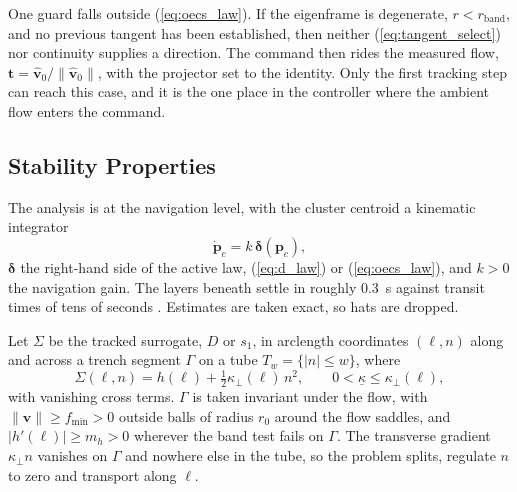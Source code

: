\documentclass[lettersize,journal]{IEEEtran}
\begin{document}
One guard falls outside (\ref{eq:oecs_law}). If the eigenframe is
degenerate, $r < r_{\mathrm{band}}$, and no previous tangent has been
established, then neither (\ref{eq:tangent_select}) nor continuity
supplies a direction. The command then rides the measured flow,
$\mathbf{t} = \hat{\mathbf{v}}_0/\|\hat{\mathbf{v}}_0\|$, with the
projector set to the identity. Only the first tracking step can reach
this case, and it is the one place in the controller where the ambient
flow enters the command.



\subsection{Stability Properties}
\label{sec:stability}

The analysis is at the navigation level, with the cluster centroid a
kinematic integrator
\begin{equation}
    \dot{\mathbf{p}}_c = k\,\boldsymbol{\delta}(\mathbf{p}_c),
    \label{eq:kinematic_model}
\end{equation}
$\boldsymbol{\delta}$ the right-hand side of the active law,
(\ref{eq:d_law}) or (\ref{eq:oecs_law}), and $k > 0$ the navigation
gain. The layers beneath settle in roughly 0.3~s against transit times
of tens of seconds \cite{9}. Estimates are taken exact, so hats are
dropped.

Let $\Sigma$ be the tracked surrogate, $D$ or $s_1$, in arclength
coordinates $(\ell, n)$ along and across a trench segment $\Gamma$ on a
tube $T_w = \{|n| \leq w\}$, where
\begin{equation}
    \Sigma(\ell, n) = h(\ell)
        + \tfrac{1}{2}\kappa_\perp(\ell)\,n^2,
    \qquad 0 < \underline{\kappa} \leq \kappa_\perp(\ell),
    \label{eq:normal_form}
\end{equation}
with vanishing cross terms. $\Gamma$ is taken invariant under the flow,
with $\lVert\mathbf{v}\rVert \geq f_{\min} > 0$ outside balls of radius
$r_0$ around the flow saddles, and $|h'(\ell)| \geq m_h > 0$ wherever
the band test fails on $\Gamma$. The transverse gradient $\kappa_\perp
n$ vanishes on $\Gamma$ and nowhere else in the tube, so the problem
splits, regulate $n$ to zero and transport along $\ell$.
\end{document}

